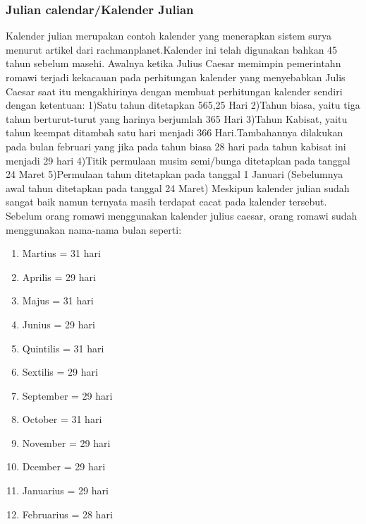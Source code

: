     \subsubsection{Julian calendar/Kalender Julian}
      Kalender julian merupakan contoh kalender yang menerapkan sistem surya menurut artikel dari rachmanplanet\cite{rachmanplanet}.Kalender ini telah digunakan bahkan 45 tahun sebelum masehi.
    Awalnya ketika Julius Caesar memimpin pemerintahn romawi terjadi kekacauan  pada perhitungan kalender yang menyebabkan Julis Caesar saat itu mengakhirinya dengan membuat perhitungan kalender sendiri dengan ketentuan:
      1)Satu tahun ditetapkan 565,25 Hari
      2)Tahun biasa, yaitu tiga tahun berturut-turut yang harinya berjumlah 365 Hari
      3)Tahun Kabisat, yaitu tahun keempat ditambah satu hari menjadi 366 Hari.Tambahannya dilakukan pada bulan februari yang jika pada tahun biasa 28 hari pada tahun kabisat ini menjadi 29 hari
      4)Titik permulaan musim semi/bunga ditetapkan pada tanggal 24 Maret
      5)Permulaan tahun ditetapkan pada tanggal 1 Januari (Sebelumnya awal tahun ditetapkan pada tanggal 24 Maret)
    Meskipun kalender julian sudah sangat baik namun ternyata masih terdapat cacat pada kalender tersebut.
    Sebelum orang romawi menggunakan kalender julius caesar, orang romawi sudah menggunakan nama-nama bulan seperti:
    \begin{enumerate}
      \item  Martius     = 31 hari
      \item  Aprilis     = 29 hari
      \item  Majus       = 31 hari
      \item  Junius      = 29 hari
      \item  Quintilis   = 31 hari
      \item  Sextilis    = 29 hari
      \item  September   = 29 hari
      \item  October     = 31 hari
      \item  November    = 29 hari
      \item  Dcember     = 29 hari
      \item  Januarius   = 29 hari
      \item  Februarius  = 28 hari
    \end{enumerate} 

